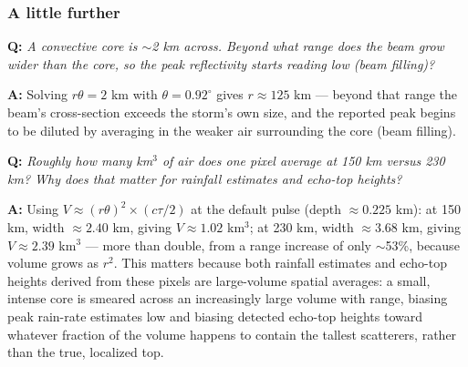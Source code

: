 \documentclass[11pt]{article}
\newenvironment{qa}[1]{\par\noindent\textbf{\color{qgray}Q: }\emph{#1}\par\noindent\textbf{A: }}{\par\vspace{6pt}}
\newcommand{\tier}[1]{\subsubsection*{#1}}
\begin{document}
\tier{A little further}
\begin{qa}{A convective core is $\sim$2 km across. Beyond what range does the beam grow wider than the core, so the peak reflectivity starts reading low (beam filling)?}
Solving $r\theta=2$ km with $\theta=0.92^\circ$ gives $r\approx125$ km --- beyond that range the beam's cross-section exceeds the storm's own size, and the reported peak begins to be diluted by averaging in the weaker air surrounding the core (beam filling).
\end{qa}
\begin{qa}{Roughly how many km$^3$ of air does one pixel average at 150 km versus 230 km? Why does that matter for rainfall estimates and echo-top heights?}
Using $V\approx(r\theta)^2\times(c\tau/2)$ at the default pulse (depth $\approx0.225$ km): at 150 km, width $\approx2.40$ km, giving $V\approx1.02$ km$^3$; at 230 km, width $\approx3.68$ km, giving $V\approx2.39$ km$^3$ --- more than double, from a range increase of only $\sim$53\%, because volume grows as $r^2$. This matters because both rainfall estimates and echo-top heights derived from these pixels are large-volume spatial averages: a small, intense core is smeared across an increasingly large volume with range, biasing peak rain-rate estimates low and biasing detected echo-top heights toward whatever fraction of the volume happens to contain the tallest scatterers, rather than the true, localized top.
\end{qa}
\end{document}
